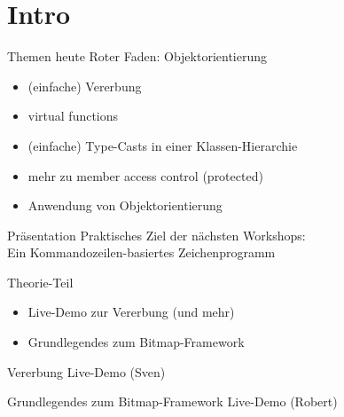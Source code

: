 \section{Intro}

\begin{frame}{Themen heute}
	Roter Faden: Objektorientierung
	\vspace{1em}
	
	\begin{itemize}
		\item (einfache) Vererbung
		\item virtual functions
		\item (einfache) Type-Casts in einer Klassen-Hierarchie
		\item mehr zu member access control (protected)
		\item Anwendung von Objektorientierung
	\end{itemize}
\end{frame}

\begin{frame}{Präsentation}
	Praktisches Ziel der nächsten Workshops:\\
	Ein Kommandozeilen-basiertes Zeichenprogramm
	
	\pause
	
	\begin{block}{Theorie-Teil}
		\begin{itemize}
			\item Live-Demo zur Vererbung (und mehr)
			\item Grundlegendes zum Bitmap-Framework
		\end{itemize}
	\end{block}
\end{frame}

\begin{frame}{Vererbung}
	\Huge{Live-Demo (Sven)}
\end{frame}

\begin{frame}{Grundlegendes zum Bitmap-Framework}
	\Huge{Live-Demo (Robert)}
\end{frame}
